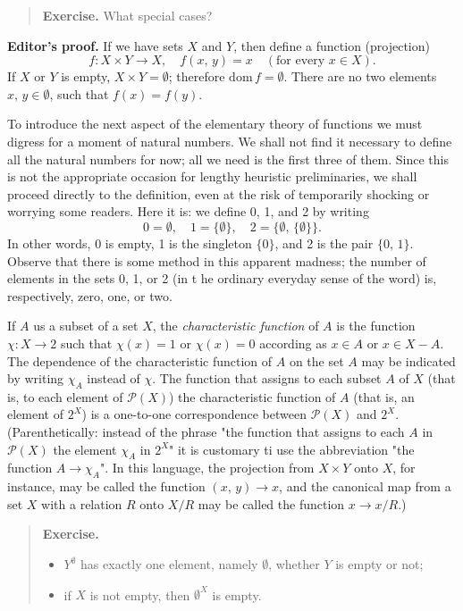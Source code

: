 \begin{quote}
	\textbf{Exercise.} What special cases? 
\end{quote}

\textbf{Editor's proof.} If we have sets $X$ and $Y$, then define a function (projection)
\[
	f : X \times Y \to X, \quad f(x, \, y) = x \quad (\text{for every } x \in X).
\]
If $X$ or $Y$ is empty, $X \times Y = \emptyset$; therefore $\text{dom} \, f = \emptyset$. There are no two elements $x, \, y \in \emptyset$, such that $f(x) = f(y)$.

To introduce the next aspect of the elementary theory of functions we must digress for a moment of natural numbers. We shall not find it necessary to define all the natural numbers for now; all we need is the first three of them. Since this is not the appropriate occasion for lengthy heuristic preliminaries, we shall proceed directly to the definition, even at the risk of temporarily shocking or worrying some readers. Here it is: we define 0, 1, and 2 by writing
\[
	0 = \emptyset, \quad 1 = \{\emptyset\}, \quad 2 = \{\emptyset, \, \{\emptyset\}\}.
\]
In other words, 0 is empty, 1 is the singleton $\{0\}$, and 2 is the pair $\{0, \, 1\}$. Observe that there is some method in this apparent madness; the number of elements in the sets 0, 1, or 2 (in t he ordinary everyday sense of the word) is, respectively, zero, one, or two.

If $A$ us a subset of a set $X$, the \textit{characteristic function} of $A$ is the function $\chi : X \to 2$ such that $\chi(x) = 1$ or $\chi(x) = 0$ according as $x \in A$ or $x \in X - A$. The dependence of the characteristic function of $A$ on the set $A$ may be indicated by writing $\chi_A$ instead of $\chi$. The function that assigns to each subset $A$ of $X$ (that is, to each element of $\mathcal{P}(X)$) the characteristic function of $A$ (that is, an element of $2^X$) is a one-to-one correspondence between $\mathcal{P}(X)$ and $2^X$.  (Parenthetically: instead of the phrase "the function that assigns to each $A$ in $\mathcal{P}(X)$ the element $\chi_A$ in $2^X$" it is customary ti use the abbreviation "the function $A \to \chi_A$". In this language, the projection from $X \times Y$ onto $X$, for instance, may be called the function $(x, \, y) \to x$, and the canonical map from a set $X$ with a relation $R$ onto $X / R$ may be called the function $x \to x/ R$.)

\begin{quote}
	\textbf{Exercise.}
	\begin{itemize}
		\item $Y^\emptyset$ has exactly one element, namely $\emptyset$, whether $Y$ is empty or not;
		\item if $X$ is not empty, then $\emptyset^X$ is empty.
	\end{itemize}
\end{quote}

